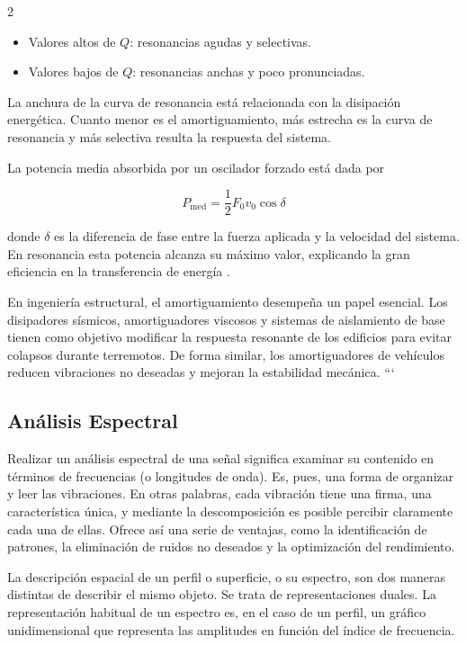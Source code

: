 \documentclass[10pt]{article}
\begin{document}
\begin{multicols}{2}
\begin{itemize}
\item Valores altos de $Q$: resonancias agudas y selectivas.
\item Valores bajos de $Q$: resonancias anchas y poco pronunciadas.
\end{itemize}

La anchura de la curva de resonancia está relacionada con la disipación energética. Cuanto menor es el amortiguamiento, más estrecha es la curva de resonancia y más selectiva resulta la respuesta del sistema.

La potencia media absorbida por un oscilador forzado está dada por

\begin{equation}
P_{\mathrm{med}}=
\frac{1}{2}F_{0}v_{0}\cos\delta
\end{equation}

donde $\delta$ es la diferencia de fase entre la fuerza aplicada y la velocidad del sistema. En resonancia esta potencia alcanza su máximo valor, explicando la gran eficiencia en la transferencia de energía \citep{French1971}.

En ingeniería estructural, el amortiguamiento desempeña un papel esencial. Los disipadores sísmicos, amortiguadores viscosos y sistemas de aislamiento de base tienen como objetivo modificar la respuesta resonante de los edificios para evitar colapsos durante terremotos. De forma similar, los amortiguadores de vehículos reducen vibraciones no deseadas y mejoran la estabilidad mecánica.
```


\subsection{Análisis Espectral}
Realizar un análisis espectral de una señal significa examinar su contenido en términos de frecuencias (o longitudes de onda). Es, pues, una forma de organizar y leer las vibraciones. En otras palabras, cada vibración tiene una firma, una característica única, y mediante la descomposición es posible percibir claramente cada una de ellas. Ofrece así una serie de ventajas, como la identificación de patrones, la eliminación de ruidos no deseados y la optimización del rendimiento.

La descripción espacial de un perfil o superficie, o su espectro, son dos maneras distintas de describir el mismo objeto. Se trata de representaciones duales. La representación habitual de un espectro es, en el caso de un perfil, un gráfico unidimensional que representa las amplitudes en función del índice de frecuencia. 


\end{multicols}
\end{document}
